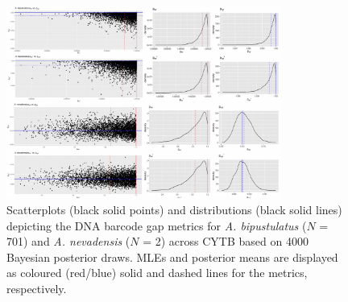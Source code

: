 \documentclass[12pt]{article}
\begin{document}
\begin{figure}[H]

\centering

\small

\includegraphics[width=0.80\textwidth]{Figure2}

\caption{Scatterplots (black solid points) and distributions (black solid lines) depicting the DNA barcode gap metrics for \textit{A. bipustulatus} ($N$ = 701) and  \textit{A. nevadensis} ($N$ = 2) across CYTB based on 4000 Bayesian posterior draws. MLEs and posterior means are displayed as coloured (red/blue) solid and dashed lines for the metrics, respectively.}

\end{figure}
\end{document}
